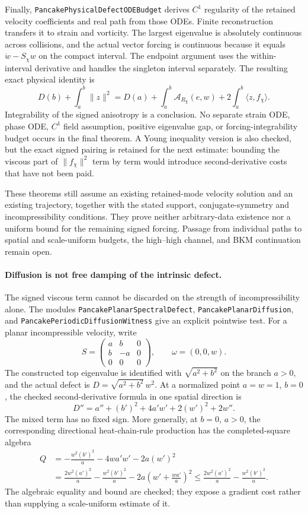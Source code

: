 \documentclass[11pt]{article}
\theoremstyle{definition}
\begin{document}
Finally, \texttt{PancakePhysicalDefectODEBudget} derives $C^1$ regularity
of the retained velocity coefficients and real path from those ODEs.
Finite reconstruction transfers it to strain and vorticity. The
largest eigenvalue is absolutely continuous across collisions, and
the actual vector forcing is continuous because it equals
$\dot w-S_\chi w$ on the compact interval. The endpoint argument uses
the within-interval derivative and handles the singleton interval separately.
The resulting exact physical identity is
\[
 D(b)+\int_a^b\|z\|^2
 =D(a)+\int_a^b\mathcal A_{R_\chi}(e,w)
       +2\int_a^b\langle z,f_\chi\rangle.
\]
Integrability of the signed anisotropy is a conclusion. No separate
strain ODE, phase ODE, $C^1$ field assumption, positive eigenvalue gap,
or forcing-integrability budget occurs in the final theorem. A Young
inequality version is also checked, but the exact signed pairing is
retained for the next estimate: bounding the viscous part of
$\|f_\chi\|^2$ term by term would introduce second-derivative costs
that have not been paid.

These theorems still assume an existing retained-mode velocity solution
and an existing trajectory, together with the stated support,
conjugate-symmetry and incompressibility conditions. They prove neither
arbitrary-data existence nor a uniform bound for the remaining signed
forcing. Passage from individual paths to spatial and scale-uniform
budgets, the high--high channel, and BKM continuation remain open.

\paragraph{Diffusion is not free damping of the intrinsic defect.}
The signed viscous term cannot be discarded on the strength of
incompressibility alone. The modules \texttt{PancakePlanarSpectralDefect},
\texttt{PancakePlanarDiffusion}, and
\texttt{PancakePeriodicDiffusionWitness} give an explicit pointwise test.
For a planar incompressible velocity, write
\[
 S=\begin{pmatrix}a&b&0\\b&-a&0\\0&0&0\end{pmatrix},
 \qquad \omega=(0,0,w).
\]
The constructed top eigenvalue is identified with
$\sqrt{a^2+b^2}$ on the branch $a>0$, and the actual defect is
$D=\sqrt{a^2+b^2}\,w^2$. At a normalized point $a=w=1$, $b=0$,
the checked second-derivative formula in one spatial direction is
\[
 D''=a''+(b')^2+4a'w'+2(w')^2+2w''.
\]
The mixed term has no fixed sign. More generally, at $b=0$, $a>0$,
the corresponding directional heat-chain-rule production has the
completed-square algebra
\begin{align*}
 Q&=-\frac{w^2(b')^2}{a}-4wa'w'-2a(w')^2\\
  &=\frac{2w^2(a')^2}{a}-\frac{w^2(b')^2}{a}
       -2a\left(w'+\frac{wa'}a\right)^2
   \le \frac{2w^2(a')^2}{a}-\frac{w^2(b')^2}{a}.
\end{align*}
The algebraic equality and bound are checked; they expose a gradient cost
rather than supplying a scale-uniform estimate of it.
\end{document}
